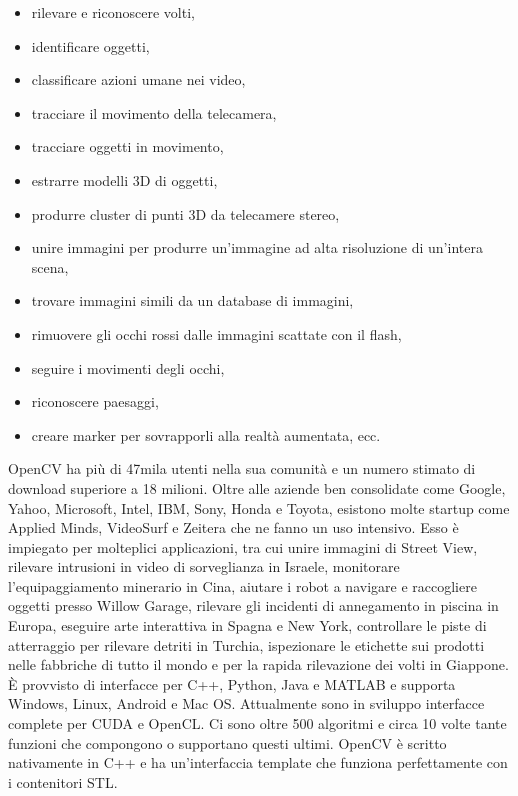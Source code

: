 \begin{itemize}
  \item rilevare e riconoscere volti, 
  \item identificare oggetti, 
  \item classificare azioni umane nei video, 
  \item tracciare il movimento della telecamera, 
  \item tracciare oggetti in movimento, 
  \item estrarre modelli 3D di oggetti, 
  \item produrre cluster di punti 3D da telecamere stereo, 
  \item unire immagini per produrre un'immagine ad alta risoluzione di un'intera scena, 
  \item trovare immagini simili da un database di immagini, 
  \item rimuovere gli occhi rossi dalle immagini scattate con il flash, 
  \item seguire i movimenti degli occhi, 
  \item riconoscere paesaggi,
  \item creare marker per sovrapporli alla realtà aumentata, ecc. 
\end{itemize}

OpenCV ha più di 47mila utenti nella sua comunità e un numero stimato di download superiore a 18 milioni.
Oltre alle aziende ben consolidate come Google, Yahoo, Microsoft, Intel, IBM, Sony, Honda e Toyota, esistono molte startup come Applied Minds, VideoSurf e Zeitera che ne fanno un uso intensivo. 
Esso è impiegato per molteplici applicazioni, tra cui unire immagini di Street View, rilevare intrusioni in video di sorveglianza in Israele, monitorare l'equipaggiamento minerario in Cina, aiutare i robot a navigare e raccogliere oggetti presso Willow Garage, rilevare gli incidenti di annegamento in piscina in Europa, eseguire arte interattiva in Spagna e New York, controllare le piste di atterraggio per rilevare detriti in Turchia, ispezionare le etichette sui prodotti nelle fabbriche di tutto il mondo e per la rapida rilevazione dei volti in Giappone.
È provvisto di interfacce per C++, Python, Java e MATLAB e supporta Windows, Linux, Android e Mac OS. 
Attualmente sono in sviluppo interfacce complete per CUDA e OpenCL. 
Ci sono oltre 500 algoritmi e circa 10 volte tante funzioni che compongono o supportano questi ultimi.
OpenCV è scritto nativamente in C++ e ha un'interfaccia template che funziona perfettamente con i contenitori STL.

